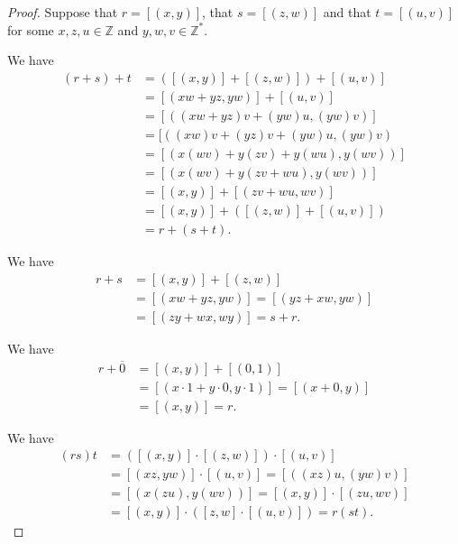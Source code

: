 \begin{proof}
	Suppose that $r = [(x, y)]$, that $s = [(z, w)]$ and that $t = [(u, v)]$ for some $x, z, u \in \mathbb{Z}$ and $y, w, v \in \mathbb{Z}^{*}$.

	We have
	\begin{align*}
		(r + s) + t & = ([(x, y)] + [(z, w)]) + [(u, v)]     \\
		            & = [(x w + y z, y w)] + [(u, v)]        \\
		            & = [((x w + y z)v + (y w)u, (y w)v)]    \\
		            & = [((x w)v + (y z)v + (y w)u, (y w)v)  \\
		            & = [(x(w v) + y(z v) + y(w u), y(w v))] \\
		            & = [(x(w v) + y(z v + w u), y(w v))]    \\
		            & = [(x, y)] + [(z v + w u, w v)]        \\
		            & = [(x, y)] + ([(z, w)] + [(u, v)])     \\
		            & = r + (s + t).
	\end{align*}

	We have
	\begin{align*}
		r + s & = [(x, y)] + [(z, w)]                     \\
		      & = [(x w + y z, y w)] = [(y z + x w, y w)] \\
		      & = [(z y + w x, w y)] = s + r.
	\end{align*}

	We have
	\begin{align*}
		r + \overline{0} & = [(x, y)] + [(0, 1)]                                 \\
		                 & = [(x \cdot 1 + y \cdot 0, y \cdot 1)] = [(x + 0, y)] \\
		                 & = [(x, y)] = r.
	\end{align*}

	We have
	\begin{align*}
		(r s)t & = ([(x, y)] \cdot [(z, w)]) \cdot [(u, v)]         \\
		       & = [(x z, y w)] \cdot [(u, v)] = [((x z)u, (y w)v)] \\
		       & = [(x(z u), y(w v))] = [(x, y)] \cdot [(z u, w v)] \\
		       & = [(x, y)] \cdot ([z, w] \cdot [(u, v)]) = r(s t).
	\end{align*}


\end{proof}
